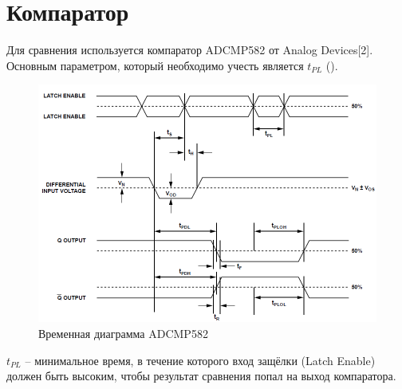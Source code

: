 \section{Компаратор}

Для сравнения используется компаратор ADCMP582 от Analog Devices[2]. Основным параметром, который необходимо учесть является $ t_{PL} $ ().

\begin{figure}[ht!] 
	\center
	\includegraphics [scale=0.7] {my_folder/images//cmp_wave}
	\caption{Временная диаграмма ADCMP582} 
	\label{fig:cmp-wave}  
\end{figure}
\FloatBarrier

$ t_{PL} $ -- минимальное время, в течение которого вход защёлки (Latch Enable) должен быть высоким, чтобы результат сравнения попал на выход компаратора.

\newpage